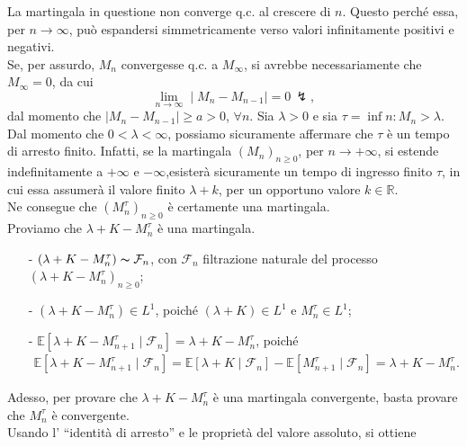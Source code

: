 \documentclass[11pt,largemargins]{homework}
\begin{document}
\begin{enumerate}
  \newpage
  \begin{alphaparts}
  \questionpart
  La martingala in questione non converge q.c. al crescere di $n$. Questo perché essa, per $n\rightarrow \infty$, può espandersi simmetricamente verso valori infinitamente positivi e negativi.\\
  Se, per assurdo, $M_{n}$ convergesse q.c. a $M_{\infty}$, si avrebbe necessariamente che $M_{\infty}=0$, da cui
  \begin{equation*}
  \lim\limits_{n\rightarrow \infty}\mid M_{n}-M_{n-1}\mid=0 \,\lightning,
  \end{equation*}
   dal momento che $\mid M_{n}-M_{n-1}\mid\geq a>0$, $\forall n$. 
   \questionpart
   Sia $\lambda>0$ e sia $\tau=\inf{n:M_{n}>\lambda}$.\\
   Dal momento che $0<\lambda<\infty$, possiamo sicuramente affermare che $\tau$ è un tempo di arresto finito. Infatti, se la martingala $\left(M_{n}\right)_{n\geq 0}$, per $n\rightarrow +\infty$, si estende indefinitamente a $+\infty$ e $-\infty$,esisterà sicuramente un tempo di ingresso finito $\tau$, in cui essa assumerà il valore finito $\lambda + k$, per un opportuno valore $k\in \mathbb{R}$.\\
   Ne consegue che $\left(M_{n}^{\tau}\right)_{n\geq 0}$ è certamente una martingala.\\
   Proviamo che $\lambda+K-M_{n}^{\tau}$ è una martingala.
   \begin{itemize}
   \item[-]
   $\left(\lambda+K-M_{n}^{\tau}\right)\thicksim\mathcal{F}_{n}$, con $\mathcal{F}_{n}$ filtrazione naturale del processo $\left(\lambda+K-M_{n}^{\tau}\right)_{n\geq 0}$;
   \item[-]
   $\left(\lambda+K-M_{n}^{\tau}\right)\in L^{1}$, poiché $\left(\lambda+K\right)\in L^{1}$ e $M_{n}^{\tau}\in L^{1}$;
   \item[-]
   $\mathbb{E}[\lambda+K-M_{n+1}^{\tau}\mid \mathcal{F}_{n}]=\lambda+K-M_{n}^{\tau}$, poiché
   \begin{align*}
   \mathbb{E}[\lambda+K-M_{n+1}^{\tau}\mid \mathcal{F}_{n}]=\mathbb{E}[\lambda+K\mid \mathcal{F}_{n}]-\mathbb{E}[M_{n+1}^{\tau}\mid \mathcal{F}_{n}]=\lambda+K-M_{n}^{\tau}.
   \end{align*}
  \end{itemize}    
    Adesso, per provare che $\lambda+K-M_{n}^{\tau}$ è una martingala convergente, basta provare che $M_{n}^{\tau}$ è convergente.\\
    Usando l' ``identità di arresto'' e le proprietà del valore assoluto, si ottiene

\end{alphaparts}
\end{enumerate}
\end{document}
